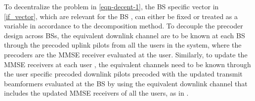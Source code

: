 To decentralize the problem in \eqref{eqn-decent-1}, the \ac{BS} specific vector  in \eqref{if_vector}, which are relevant for the \ac{BS} , can either be fixed or treated as a variable in accordance to the decomposition method. To decouple the precoder design across \acp{BS}, the equivalent downlink channel  are to be known at each \ac{BS}  through the precoded uplink pilots from all the users in the system, where the precoders are the \ac{MMSE} receiver  evaluated at the user. Similarly, to update the \ac{MMSE} receivers at each user , the equivalent channels  need to be known through the user specific precoded downlink pilots precoded with the updated transmit beamformers  evaluated at the \ac{BS}  by using the equivalent downlink channel that includes the updated \ac{MMSE} receivers of all the users, as in \cite{komulainen2013effective}. %